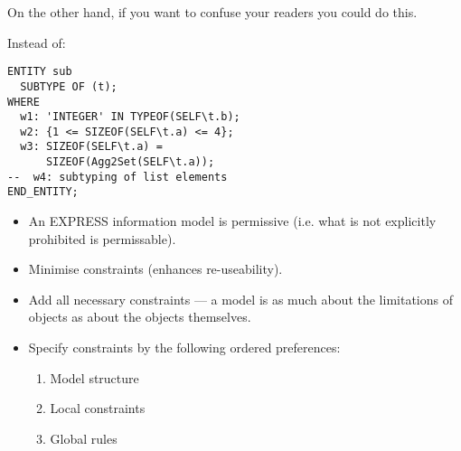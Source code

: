 \begin{remarks}
\remintro
{}

    On the other hand, if you want to confuse your readers you could
do this.

\remend
\end{remarks}

\clearpage

    Instead of:

\begin{verbatim}
ENTITY sub
  SUBTYPE OF (t);
WHERE
  w1: 'INTEGER' IN TYPEOF(SELF\t.b);
  w2: {1 <= SIZEOF(SELF\t.a) <= 4};
  w3: SIZEOF(SELF\t.a) = 
      SIZEOF(Agg2Set(SELF\t.a));
--  w4: subtyping of list elements
END_ENTITY;
\end{verbatim}


\begin{remarks}
\remintro
{}

\remend
\end{remarks}


\begin{itemize}
\item An EXPRESS information model is permissive (i.e. what is not explicitly
prohibited is permissable).

\item Minimise constraints (enhances re-useability).

\item Add all necessary constraints --- a model is as much about the
limitations of objects as about the objects themselves.

\item Specify constraints by the following ordered preferences:

\begin{enumerate}
\item Model structure
\item Local constraints
\item Global rules
\end{enumerate}

\end{itemize}

\endinput



